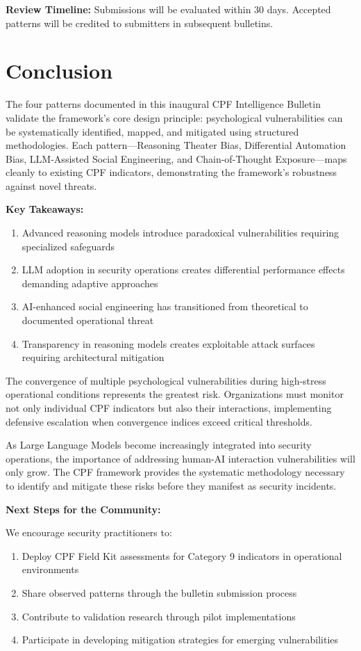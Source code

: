 \documentclass[11pt,a4paper]{article}
\begin{document}
\textbf{Review Timeline:} Submissions will be evaluated within 30 days. Accepted patterns will be credited to submitters in subsequent bulletins.

\section{Conclusion}

The four patterns documented in this inaugural CPF Intelligence Bulletin validate the framework's core design principle: psychological vulnerabilities can be systematically identified, mapped, and mitigated using structured methodologies. Each pattern—Reasoning Theater Bias, Differential Automation Bias, LLM-Assisted Social Engineering, and Chain-of-Thought Exposure—maps cleanly to existing CPF indicators, demonstrating the framework's robustness against novel threats.

\textbf{Key Takeaways:}
\begin{enumerate}
\item Advanced reasoning models introduce paradoxical vulnerabilities requiring specialized safeguards
\item LLM adoption in security operations creates differential performance effects demanding adaptive approaches
\item AI-enhanced social engineering has transitioned from theoretical to documented operational threat
\item Transparency in reasoning models creates exploitable attack surfaces requiring architectural mitigation
\end{enumerate}

The convergence of multiple psychological vulnerabilities during high-stress operational conditions represents the greatest risk. Organizations must monitor not only individual CPF indicators but also their interactions, implementing defensive escalation when convergence indices exceed critical thresholds.

As Large Language Models become increasingly integrated into security operations, the importance of addressing human-AI interaction vulnerabilities will only grow. The CPF framework provides the systematic methodology necessary to identify and mitigate these risks before they manifest as security incidents.

\textbf{Next Steps for the Community:}

We encourage security practitioners to:
\begin{enumerate}
\item Deploy CPF Field Kit assessments for Category 9 indicators in operational environments
\item Share observed patterns through the bulletin submission process
\item Contribute to validation research through pilot implementations
\item Participate in developing mitigation strategies for emerging vulnerabilities
\end{enumerate}
\end{document}
